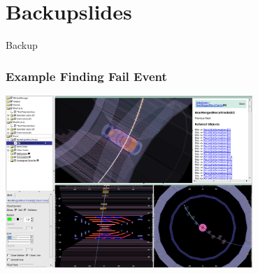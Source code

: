 \documentclass[18pt]{beamer}
\begin{document}
  \section{Backupslides}
  
  \begin{frame}
    \begin{center}
      \huge Backup
    \end{center}
  \end{frame}

    \begin{frame}
    \begin{center}
      \frametitle{Example Finding Fail Event}
      \includegraphics[width=0.7\textwidth]{figures/b2display_example_1trackevt.png}
    \end{center}
  \end{frame}
\end{document}
